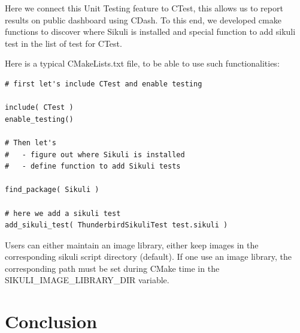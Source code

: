 \documentclass{InsightArticle}
\begin{document}
Here we connect this Unit Testing feature to CTest, this allows us to report
results on public dashboard using CDash. To this end, we developed cmake
functions to discover where Sikuli is installed and special function to add
sikuli test in the list of test for CTest.

Here is a typical CMakeLists.txt file, to be able to use such functionalities:

\begin{verbatim}
# first let's include CTest and enable testing

include( CTest )
enable_testing()

# Then let's
#   - figure out where Sikuli is installed
#   - define function to add Sikuli tests

find_package( Sikuli )

# here we add a sikuli test
add_sikuli_test( ThunderbirdSikuliTest test.sikuli )
\end{verbatim}

Users can either maintain an image library, either keep images in the
corresponding sikuli script directory (default). If one use an image library,
the corresponding path must be set during CMake time in
the SIKULI\_IMAGE\_LIBRARY\_DIR variable.


\section{Conclusion}

\clearpage



\end{document}
